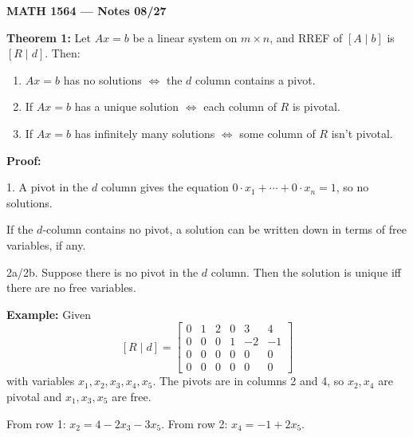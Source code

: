 \documentclass{article}
\begin{document}
\textbf{MATH 1564 --- Notes 08/27}

\bigskip

\textbf{Theorem 1:} Let $Ax = b$ be a linear system on $m \times n$, and RREF of $[A \mid b]$ is $[R \mid d]$. Then:
\begin{enumerate}
\item $Ax = b$ has no solutions $\iff$ the $d$ column contains a pivot.
\item If $Ax = b$ has a unique solution $\iff$ each column of $R$ is pivotal.
\item If $Ax = b$ has infinitely many solutions $\iff$ some column of $R$ isn't pivotal.
\end{enumerate}

\medskip

\textbf{Proof:}

1. A pivot in the $d$ column gives the equation $0 \cdot x_1 + \cdots + 0 \cdot x_n = 1$, so no solutions.

If the $d$-column contains no pivot, a solution can be written down in terms of free variables, if any.

\bigskip

2a/2b. Suppose there is no pivot in the $d$ column. Then the solution is unique iff there are no free variables.

\newpage

\textbf{Example:} Given
\[
[R \mid d] =
\left[
\begin{array}{ccccc|c}
0 & 1 & 2 & 0 & 3 & 4 \\
0 & 0 & 0 & 1 & -2 & -1 \\
0 & 0 & 0 & 0 & 0 & 0 \\
0 & 0 & 0 & 0 & 0 & 0
\end{array}
\right]
\]
with variables $x_1, x_2, x_3, x_4, x_5$. The pivots are in columns 2 and 4, so $x_2, x_4$ are pivotal and $x_1, x_3, x_5$ are free.

From row 1: $x_2 = 4 - 2x_3 - 3x_5$. From row 2: $x_4 = -1 + 2x_5$.
\end{document}
